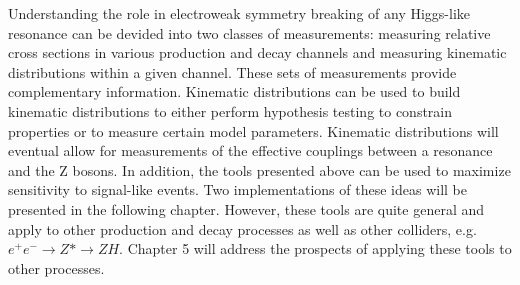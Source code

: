 Understanding the role in electroweak symmetry breaking of any 
Higgs-like resonance can be devided into two classes of
measurements: measuring relative cross sections in various 
production and decay channels and measuring kinematic distributions
within a given channel.  These sets of measurements provide
complementary information.  Kinematic distributions can be used
to build kinematic distributions to either perform hypothesis 
testing to constrain properties or to measure certain model
parameters.  Kinematic distributions will eventual
allow for measurements of the effective couplings between a 
resonance and the Z bosons. In addition, the tools presented above
can be used to maximize sensitivity to signal-like events.
Two implementations of these ideas will be presented in the 
following chapter. However, these tools are quite general and 
apply to other production and decay processes as well as other 
colliders, e.g. $e^+e^-\to Z*\to ZH$.  Chapter 5 will address 
the prospects of applying these tools to other processes.  
